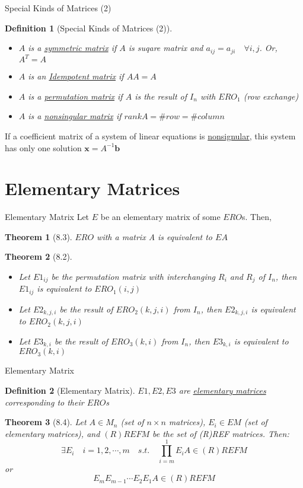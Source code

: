 \documentclass[a4paper,11pt]{article}
\newtheorem{defn}{Definition}
\newtheorem{thm}{Theorem}
\begin{document}
\begin{frame}[t]{Special Kinds of Matrices (2)}
	\begin{defn}
		[Special Kinds of Matrices (2)]
		\begin{itemize}
			\item $A$ is a \uline{symmetric matrix} if $A$ is suqare matrix and $a_{ij}=a_{ji}\quad\forall i,j$. Or, $A^T = A$
			\item $A$ is an \uline{Idempotent matrix} if $AA=A$
			\item $A$ is a \uline{permutation matrix} if $A$ is the result of $I_n$ with $ERO_1$ (row exchange)
			\item $A$ is a \uline{nonsingular matrix} if $rank A = \# row = \# column$
		\end{itemize}
	\end{defn}
	If a coefficient matrix of a system of linear equations is \uline{nonsignular}, this system has only one solution $\mathbf{x} = A^{-1}\mathbf{b}$
\end{frame}

\section{Elementary Matrices} %
\label{sec:elementary_matrices}
\begin{frame}[t]{Elementary Matrix}
	Let $E$ be an elementary matrix of some $ERO$s. Then, 
	\begin{thm}
		[8.3] $ERO$ with a matrix A is equivalent to $EA$
	\end{thm}
	\begin{thm}
		[8.2] \begin{itemize}
			\item Let $E1_{ij}$ be the permutation matrix with interchanging $R_i$ and $R_j$ of $I_n$, then $E1_{ij}$ is equivalent to $ERO_1(i,j)$
			\item Let $E2_{k,j,i}$ be the result of $ERO_2(k,j,i)$ from $I_n$, then $E2_{k,j,i}$ is equivalent to $ERO_2(k,j,i)$
			\item Let $E3_{k,i}$ be the result of $ERO_3(k,i)$ from $I_n$, then $E3_{k,i}$ is equivalent to $ERO_3(k,i)$
		\end{itemize}
	\end{thm}
\end{frame}
\begin{frame}[t]{Elementary Matrix}
	\begin{defn}
		[Elementary Matrix]
		$E1,E2,E3$ are \uline{elementary matrices} corresponding to their $ERO$s
	\end{defn}
	\begin{thm}
		[8.4] Let $A\in M_n$ (set of $n\times n$ matrices), $E_i\in EM$ (set of elementary matrices), and $(R)REFM$ be the set of (R)REF matrices. Then: \[
			\exists E_i\quad i=1,2,\cdots,m\quad s.t.\quad \prod_{i=m}^1E_i A \in (R)REFM
		\] or \[
			E_m E_{m-1}\cdots E_2E_1 A \in (R)REFM
		\]
	\end{thm}
\end{frame}
\end{document}
